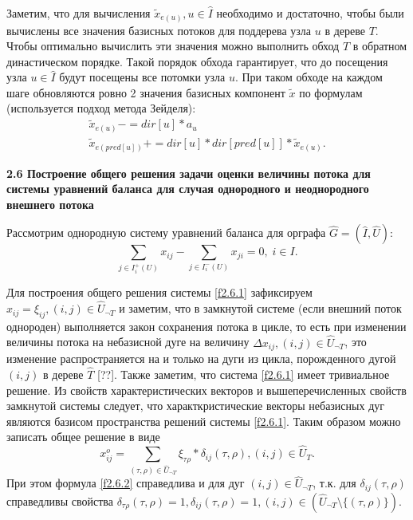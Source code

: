 \documentclass[14pt]{extarticle}%
\begin{document}
Заметим, что для вычисления $\widetilde{x}_{e(u)}, u\in \widehat{I}$ необходимо и достаточно, чтобы были вычислены все значения базисных потоков для поддерева узла $u$ в дереве $T$. Чтобы оптимально вычислить эти значения можно выполнить обход $T$ в обратном династическом порядке. Такой порядок обхода гарантирует, что до посещения узла $u\in \widehat{I}$ будут посещены все потомки узла $u$. При таком обходе на каждом шаге обновляются ровно 2 значения базисных компонент $\widetilde x$ по формулам (используется подход метода Зейделя):
\begin{equation}\label{f242}
\begin{gathered}
\widetilde{x}_{e(u)}-= dir[u]*a_u\\
\widetilde{x}_{e(pred[u])}+= dir[u]*dir[pred[u]]*\widetilde{x}_{e(u)}.
\end{gathered}
\end{equation}

\textbf{2.6 Построение общего решения задачи оценки величины потока для системы уравнений баланса для случая однородного и неоднородного внешнего потока}

Рассмотрим однородную систему уравнений баланса для орграфа $\widehat{G}=(\widehat{I},\widehat{U})$:
\begin{equation}\label{f2.6.1}
	\sum_{j\in I^+_i(U)} x_{ij}-\sum_{j\in I^-_i(U)}x_{ji}=0,\; i\in I.
\end{equation}

Для построения общего решения системы \eqref{f2.6.1} зафиксируем $x_{ij}=\xi_{ij}, (i,j)\in \widehat{U}_{\neg T}$ и заметим, что в замкнутой системе (если внешний поток однороден) выполняется закон сохранения потока в цикле, то есть при изменении величины потока на небазисной дуге на величину $\Delta x_{ij}, (i,j)\in \widehat{U}_{\neg T}$, это изменение распространяется на и только на дуги из цикла, порожденного дугой $(i,j)$ в дереве $\widehat{T}$ [??]. Также заметим, что система \eqref{f2.6.1} имеет тривиальное решение. Из свойств характеристических векторов и вышеперечисленных свойств замкнутой системы следует, что характкристические векторы небазисных дуг являются базисом пространства решений системы \eqref{f2.6.1}. Таким образом можно записать общее решение в виде
\begin{equation}\label{f2.6.2}
	x^o_{ij}=\sum_{(\tau,\rho)\in \widehat{U}_{\neg T}}\xi_{\tau\rho}*\delta_{ij}(\tau,\rho), (i,j)\in \widehat{U}_T.
\end{equation}
При этом формула \eqref{f2.6.2} справедлива и для дуг $(i,j)\in \widehat{U}_{\neg T}$, т.к. для $\delta_{ij}(\tau,\rho)$ справедливы свойства $\delta_{\tau\rho}(\tau,\rho)=1, \delta_{ij}(\tau,\rho)=1, (i,j)\in (\widehat{U}_{\neg T}\setminus\{(\tau,\rho)\})$.
\end{document}
